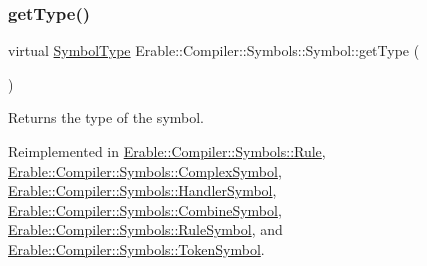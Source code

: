 \mbox{\label{class_erable_1_1_compiler_1_1_symbols_1_1_symbol_a23a0a77efd1cdab87aafdad87e4c22ba}} 
\subsubsection{\texorpdfstring{getType()}{getType()}\hspace{0.1cm}{\footnotesize\ttfamily [2/2]}}
{\footnotesize\ttfamily virtual \mbox{\hyperlink{namespace_erable_1_1_compiler_1_1_symbols_a3b60ec10cda0920ec4368128361b8320}{Symbol\+Type}} Erable\+::\+Compiler\+::\+Symbols\+::\+Symbol\+::get\+Type (\begin{DoxyParamCaption}{ }\end{DoxyParamCaption})\hspace{0.3cm}{\ttfamily [virtual]}}

\begin{DoxyReturn}{Returns}
the type of the symbol. 
\end{DoxyReturn}


Reimplemented in \mbox{\hyperlink{class_erable_1_1_compiler_1_1_symbols_1_1_rule_a6e0b51b5ecaed4785480d534dc09cb8e}{Erable\+::\+Compiler\+::\+Symbols\+::\+Rule}}, \mbox{\hyperlink{class_erable_1_1_compiler_1_1_symbols_1_1_complex_symbol_a868025e3a718e2ae6226a89403859b3a}{Erable\+::\+Compiler\+::\+Symbols\+::\+Complex\+Symbol}}, \mbox{\hyperlink{class_erable_1_1_compiler_1_1_symbols_1_1_handler_symbol_a70340ea487e496cced8c05aa45968b56}{Erable\+::\+Compiler\+::\+Symbols\+::\+Handler\+Symbol}}, \mbox{\hyperlink{struct_erable_1_1_compiler_1_1_symbols_1_1_combine_symbol_a416d89f88e2708deeaee33425849ae4a}{Erable\+::\+Compiler\+::\+Symbols\+::\+Combine\+Symbol}}, \mbox{\hyperlink{class_erable_1_1_compiler_1_1_symbols_1_1_rule_symbol_a83de7b4d8a52eb6da9298fb19f020d49}{Erable\+::\+Compiler\+::\+Symbols\+::\+Rule\+Symbol}}, and \mbox{\hyperlink{class_erable_1_1_compiler_1_1_symbols_1_1_token_symbol_ab80bcf5e531cee5fbb5fe798449e4cbb}{Erable\+::\+Compiler\+::\+Symbols\+::\+Token\+Symbol}}.

\mbox{\label{class_erable_1_1_compiler_1_1_symbols_1_1_symbol_a0d50ab85e48e583a4664a1fa37fe6791}} 
